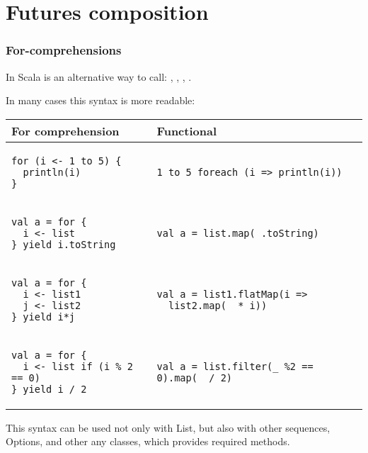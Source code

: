 \section{Futures composition}

\begin{frame}[fragile]
\frametitle{For-comprehensions}
In Scala  is an alternative way to call: , ,
, .

In many cases this syntax is more readable:
\lstset{numbers=none}
\begin{table}
\renewcommand{\arraystretch}{1.5}
\begin{tabular*}{0.9\textwidth}{ l l }
\hline
For comprehension & Functional \\ \hline

\begin{lstlisting}
for (i <- 1 to 5) {
  println(i)
}
\end{lstlisting}
&
\begin{lstlisting}
1 to 5 foreach (i => println(i))
\end{lstlisting}
\\ \hline
\begin{lstlisting}
val a = for {
  i <- list
} yield i.toString
\end{lstlisting}
&
\begin{lstlisting}
val a = list.map(_.toString)
\end{lstlisting}
\\ \hline
\begin{lstlisting}
val a = for {
  i <- list1
  j <- list2
} yield i*j
\end{lstlisting}
&
\begin{lstlisting}
val a = list1.flatMap(i =>
  list2.map(_ * i))
\end{lstlisting}
\\ \hline
\begin{lstlisting}
val a = for {
  i <- list if (i % 2 == 0)
} yield i / 2
\end{lstlisting}
&
\begin{lstlisting}
val a = list.filter(_ %2 == 0).map(_ / 2)
\end{lstlisting}
\end{tabular*}
\end{table}

This syntax can be used not only with List, but also with other sequences,
Options, and other any classes, which provides required methods.
\end{frame}

